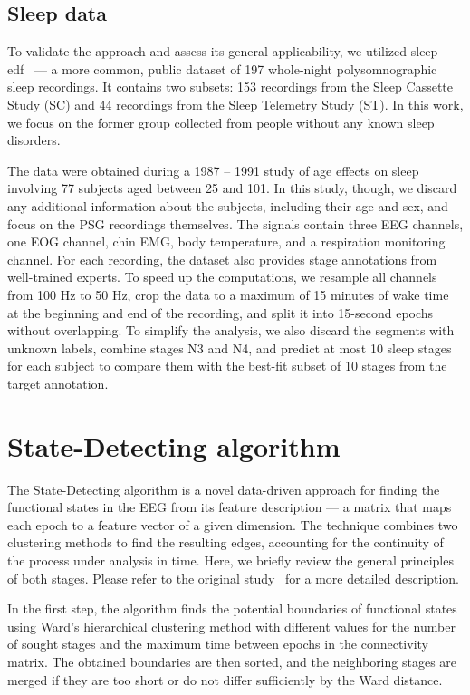 \documentclass[journal,twoside,web]{ieeecolor2}
\begin{document}
\subsection{Sleep data}

To validate the approach and assess its general applicability, we utilized sleep-edf~\cite{SleepEdf,PhysioNet} --- a more common, public dataset of 197 whole-night polysomnographic sleep recordings. It contains two subsets: 153 recordings from the Sleep Cassette Study (SC) and 44 recordings from the Sleep Telemetry Study (ST). In this work, we focus on the former group collected from people without any known sleep disorders.

The data were obtained during a 1987 -- 1991 study of age effects on sleep involving 77 subjects aged between 25 and 101. In this study, though, we discard any additional information about the subjects, including their age and sex, and focus on the PSG recordings themselves. The signals contain three EEG channels, one EOG channel, chin EMG, body temperature, and a respiration monitoring channel. For each recording, the dataset also provides stage annotations from well-trained experts. To speed up the computations, we resample all channels from 100 Hz to 50 Hz, crop the data to a maximum of 15 minutes of wake time at the beginning and end of the recording, and split it into 15-second epochs without overlapping. To simplify the analysis, we also discard the segments with unknown labels, combine stages N3 and N4, and predict at most 10 sleep stages for each subject to compare them with the best-fit subset of 10 stages from the target annotation.

\section{State-Detecting algorithm}

The State-Detecting algorithm is a novel data-driven approach for finding the functional states in the EEG from its feature description --- a matrix that maps each epoch to a feature vector of a given dimension. The technique combines two clustering methods to find the resulting edges, accounting for the continuity of the process under analysis in time. Here, we briefly review the general principles of both stages. Please refer to the original study~\cite{SDA} for a more detailed description.

In the first step, the algorithm finds the potential boundaries of functional states using Ward's hierarchical clustering method with different values for the number of sought stages and the maximum time between epochs in the connectivity matrix. The obtained boundaries are then sorted, and the neighboring stages are merged if they are too short or do not differ sufficiently by the Ward distance.
\end{document}
